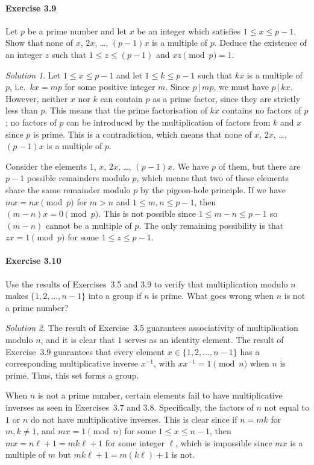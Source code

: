 \documentclass[11pt]{report}
\theoremstyle{remark}
\newtheorem*{solution}{Solution}
\begin{document}
    \paragraph{Exercise 3.9} Let $p$ be a prime number and let $x$ be an integer
    which satisfies $1 \leq x \leq p - 1$. Show that none of $x$, $2x$, \dots, $(p -
    1)x$ is a multiple of $p$. Deduce the existence of an integer $z$ such that $1
    \leq z \leq (p - 1)$ and $xz \pmod{p} = 1$.
    \begin{solution}
        Let $1 \leq x \leq p - 1$ and let $1 \leq k \leq p - 1$ such that $kx$ is a
        multiple of $p$, i.e.\ $kx = mp$ for some positive integer $m$. Since $p
        \,|\, mp$, we must have $p \,|\, kx$. However, neither $x$ nor $k$ can
        contain $p$ as a prime factor, since they are strictly less than $p$. This
        means that the prime factorisation of $kx$ contains no factors of $p$; no
        factors of $p$ can be introduced by the multiplication of factors from $k$
        and $x$ since $p$ is prime. This is a contradiction, which means that none
        of $x$, $2x$, \dots, $(p - 1)x$ is a multiple of $p$.

        Consider the elements $1$, $x$, $2x$, \dots, $(p - 1)x$. We have $p$ of
        them, but there are $p - 1$ possible remainders modulo $p$, which means that
        two of these elements share the same remainder modulo $p$ by the pigeon-hole
        principle. If we have $mx = nx \pmod{p}$ for $m > n$ and $1 \leq m, n \leq p
        - 1$, then $(m - n)x = 0 \pmod{p}$. This is not possible since $1 \leq m - n
        \leq p - 1$ so $(m - n)$ cannot be a multiple of $p$. The only remaining
        possibility is that $zx = 1 \pmod{p}$ for some $1 \leq z \leq p - 1$.
    \end{solution}
    
    \paragraph{Exercise 3.10} Use the results of Exercises~3.5 and 3.9 to verify
    that multiplication modulo $n$ makes $\{1, 2, \dots, n - 1\}$ into a group if
    $n$ is prime. What goes wrong when $n$ is not a prime number?
    \begin{solution}
        The result of Exercise~3.5 guarantees associativity of multiplication modulo
        $n$, and it is clear that $1$ serves as an identity element. The result of
        Exercise~3.9 guarantees that every element $x \in \{1, 2, \dots, n - 1\}$
        has a corresponding multiplicative inverse $x^{-1}$, with $x x^{-1} = 1
        \pmod{n}$ when $n$ is prime. Thus, this set forms a group.

        When $n$ is not a prime number, certain elements fail to have multiplicative
        inverses as seen in Exercises~3.7 and 3.8. Specifically, the factors of $n$
        not equal to $1$ or $n$ do not have multiplicative inverses. This is clear
        since if $n = mk$ for $m, k \neq 1$, and $mx = 1 \pmod{n}$ for some $1 \leq
        x \leq n - 1$, then $mx = n\ell + 1 = mk\ell + 1$ for some integer $\ell$,
        which is impossible since $mx$ is a multiple of $m$ but $mk\ell + 1 =
        m(k\ell) + 1$ is not.
    \end{solution}
    
\end{document}
